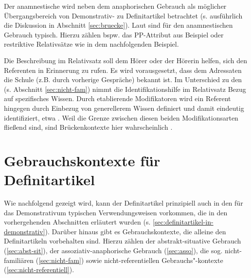 \begin{exe}
	\ex \label{ex:kinder}    
\end{exe}

Der anamnestische wird neben dem anaphorischen Gebrauch als möglicher Übergangsbereich von Demonstrativ- zu Definitartikel betrachtet (s. ausführlich die Diskussion in Abschnitt \ref{sec:bruecke}). Laut \textcite[73]{Himmelmann1997} sind für den anamnestischen Gebrauch  typisch. Hierzu zählen bspw. das PP-Attribut  aus Beispiel  oder restriktive Relativsätze wie in dem nachfolgenden Beispiel.

\begin{exe}
	\ex \label{ex:film}     
\end{exe}
\noindent 
Die Beschreibung im Relativsatz soll dem Hörer oder der Hörerin helfen, sich den Referenten in Erinnerung zu rufen. Es wird vorausgesetzt, dass dem Adressaten die Schule (z.B. durch vorherige Gespräche) bekannt ist. Im Unterschied zu den  (s. Abschnitt \ref{sec:nicht-fam}) nimmt die Identifikationshilfe im Relativsatz Bezug auf spezifisches Wissen. Durch etablierende Modifikatoren wird ein Referent hingegen durch Einbezug von generellerem Wissen  definiert und damit eindeutig identifiziert, etwa . Weil die Grenze zwischen diesen beiden Modifikationsarten fließend sind, sind Brückenkontexte hier wahrscheinlich \parencite[s. zur ausführlichen Diskussion][79--80]{Himmelmann1997}. 

\section{Gebrauchskontexte für Definitartikel}\label{sec:definitartikel}

Wie nachfolgend gezeigt wird, kann der Definitartikel prinzipiell auch in den für das Demonstrativum typischen Verwendungsweisen vorkommen, die in den vorhergehenden Abschnitten erläutert wurden (s. \ref{sec:definitartikel-in-demonstrativ}). Darüber hinaus gibt es Gebrauchskontexte, die alleine den Definitartikeln vorbehalten sind. Hierzu zählen der abstrakt-situative Gebrauch (\ref{sec:abst-sit}), der assoziativ-anaphorische Gebrauch (\ref{sec:asso}), die sog. nicht-familiären (\ref{sec:nicht-fam}) sowie nicht-referentiellen Gebrauchs"-kontexte (\ref{sec:nicht-referentiell}). 

